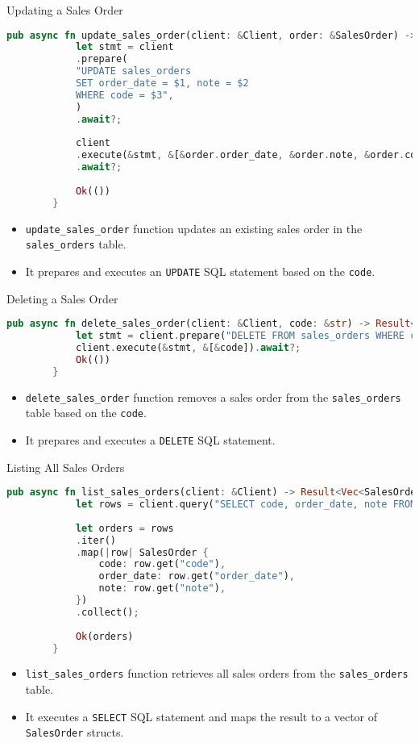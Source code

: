 \documentclass[aspectratio=169, table]{beamer}
\begin{document}
\begin{frame}[fragile]{Updating a Sales Order}
	\begin{lstlisting}[language=Rust]
		pub async fn update_sales_order(client: &Client, order: &SalesOrder) -> Result<(), Error> {
			let stmt = client
			.prepare(
			"UPDATE sales_orders
			SET order_date = $1, note = $2
			WHERE code = $3",
			)
			.await?;
			
			client
			.execute(&stmt, &[&order.order_date, &order.note, &order.code])
			.await?;
			
			Ok(())
		}
	\end{lstlisting}
	
	\begin{itemize}
		\item \texttt{update\_sales\_order} function updates an existing sales order in the \texttt{sales\_orders} table.
		\item It prepares and executes an \texttt{UPDATE} SQL statement based on the \texttt{code}.
	\end{itemize}
\end{frame}

\begin{frame}[fragile]{Deleting a Sales Order}
	\begin{lstlisting}[language=Rust]
		pub async fn delete_sales_order(client: &Client, code: &str) -> Result<(), Error> {
			let stmt = client.prepare("DELETE FROM sales_orders WHERE code = $1").await?;
			client.execute(&stmt, &[&code]).await?;
			Ok(())
		}
	\end{lstlisting}
	
	\begin{itemize}
		\item \texttt{delete\_sales\_order} function removes a sales order from the \texttt{sales\_orders} table based on the \texttt{code}.
		\item It prepares and executes a \texttt{DELETE} SQL statement.
	\end{itemize}
\end{frame}

\begin{frame}[fragile]{Listing All Sales Orders}
	\begin{lstlisting}[language=Rust]
		pub async fn list_sales_orders(client: &Client) -> Result<Vec<SalesOrder>, Error> {
			let rows = client.query("SELECT code, order_date, note FROM sales_orders ORDER BY code", &[]).await?;
			
			let orders = rows
			.iter()
			.map(|row| SalesOrder {
				code: row.get("code"),
				order_date: row.get("order_date"),
				note: row.get("note"),
			})
			.collect();
			
			Ok(orders)
		}
	\end{lstlisting}
	
	\begin{itemize}
		\item \texttt{list\_sales\_orders} function retrieves all sales orders from the \texttt{sales\_orders} table.
		\item It executes a \texttt{SELECT} SQL statement and maps the result to a vector of \texttt{SalesOrder} structs.
	\end{itemize}
\end{frame}
\end{document}
